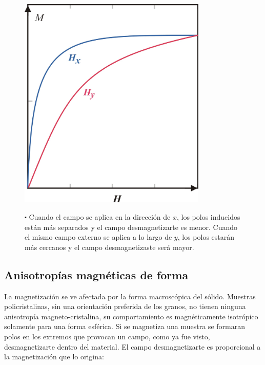 \begin{figure}[H]
\begin{minipage}[b]{0.5\linewidth}
	\raggedright
    \includegraphics[width=0.8\textwidth]{./Figures/campoDesmagnetizante1}

\end{minipage}
\begin{minipage}[b]{0.45\textwidth}
	\vspace{0pt}
$\centerdot$ Cuando el campo se aplica en la dirección de $x$, los polos inducidos están más separados y el campo desmagnetizarte es menor. Cuando el mismo campo externo se aplica a lo largo de $y$, los polos estarán más cercanos y el campo desmagnetizaste será mayor.
    \vspace{2.5cm}
\end{minipage}
\end{figure}

\subsection{Anisotropías magnéticas de forma}

La magnetización se ve afectada por la forma macroscópica del sólido. Muestras policristalinas, sin una orientación preferida de los granos, no tienen ninguna anisotropía magneto-cristalina, su comportamiento es magnéticamente isotrópico solamente para una forma esférica. Si se magnetiza una muestra se formaran polos en los extremos que provocan un campo, como ya fue visto, desmagnetizarte dentro del material. El campo desmagnetizarte es proporcional a la magnetización que lo origina:


